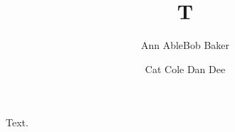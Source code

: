 \documentclass{article}
\begin{document}
\title{T}
\author{\vspace{-2em}
\hspace{-25pt}
Ann Able\footnotemark[1]
Bob Baker
\and
Cat Cole
Dan Dee}
\maketitle
Text.
\end{document}
